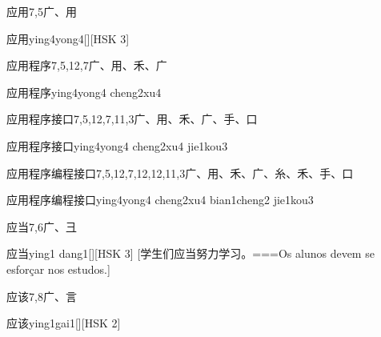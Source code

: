 \begin{Entry}{应用}{7,5}{⼴、⽤}
  \begin{Phonetics}{应用}{ying4yong4}[][HSK 3]
  \end{Phonetics}
\end{Entry}

\begin{Entry}{应用程序}{7,5,12,7}{⼴、⽤、⽲、⼴}
  \begin{Phonetics}{应用程序}{ying4yong4 cheng2xu4}
  \end{Phonetics}
\end{Entry}

\begin{Entry}{应用程序接口}{7,5,12,7,11,3}{⼴、⽤、⽲、⼴、⼿、⼝}
  \begin{Phonetics}{应用程序接口}{ying4yong4 cheng2xu4 jie1kou3}
  \end{Phonetics}
\end{Entry}

\begin{Entry*}{应用程序编程接口}{7,5,12,7,12,12,11,3}{⼴、⽤、⽲、⼴、⽷、⽲、⼿、⼝}
  \begin{Phonetics}{应用程序编程接口}{ying4yong4 cheng2xu4 bian1cheng2 jie1kou3}
  \end{Phonetics}
\end{Entry*}

\begin{Entry}{应当}{7,6}{⼴、⼹}
  \begin{Phonetics}{应当}{ying1 dang1}[][HSK 3]
    [学生们应当努力学习。===Os alunos devem se esforçar nos estudos.]
  \end{Phonetics}
\end{Entry}

\begin{Entry}{应该}{7,8}{⼴、⾔}
  \begin{Phonetics}{应该}{ying1gai1}[][HSK 2]
  \end{Phonetics}
\end{Entry}

